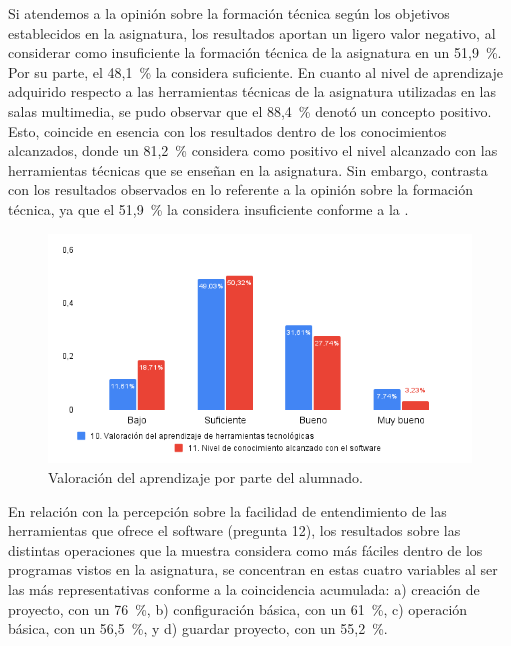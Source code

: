 \documentclass[spanish]{textolivre}
\begin{document}
Si atendemos a la opinión sobre la formación técnica según los objetivos establecidos en la asignatura, los resultados aportan un ligero valor negativo, al considerar como insuficiente la formación técnica de la asignatura en un 51,9~\%. Por su parte, el 48,1~\% la considera suficiente. En cuanto al nivel de aprendizaje adquirido respecto a las herramientas técnicas de la asignatura utilizadas en las salas multimedia, se pudo observar que el 88,4~\% denotó un concepto positivo. Esto, coincide en esencia con los resultados dentro de los conocimientos alcanzados, donde un 81,2~\% considera como positivo el nivel alcanzado con las herramientas técnicas que se enseñan en la asignatura. Sin embargo, contrasta con los resultados observados en lo referente a la opinión sobre la formación técnica, ya que el 51,9~\% la considera insuficiente conforme a la .

\begin{figure}[h!]
\centering
\begin{minipage}{.8\textwidth}
\includegraphics[width=\linewidth]{Fig1.png}
\caption{Valoración del aprendizaje por parte del alumnado.}
\label{fig1}
\end{minipage}
\end{figure}

En relación con la percepción sobre la facilidad de entendimiento de las herramientas que ofrece el software (pregunta 12), los resultados sobre las distintas operaciones que la muestra considera como más fáciles dentro de los programas vistos en la asignatura, se concentran en estas cuatro variables al ser las más representativas conforme a la coincidencia acumulada: a) creación de proyecto, con un 76~\%, b) configuración básica, con un 61~\%, c) operación básica, con un 56,5~\%, y d) guardar proyecto, con un 55,2~\%.
\end{document}
